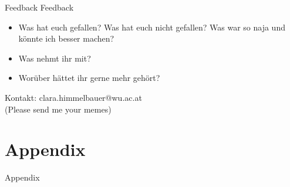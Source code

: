 \documentclass[aspectratio=169,xcolor=dvipsnames]{beamer}
\begin{document}
\begin{frame}{Feedback}
    Feedback
    \begin{itemize}
        \item Was hat euch gefallen? Was hat euch nicht gefallen? Was war so naja und könnte ich besser machen?
        \item Was nehmt ihr mit?
        \item Worüber hättet ihr gerne mehr gehört?
    \end{itemize}

    \vspace{0.5cm}
    \pause
    \begin{center}
        Kontakt: clara.himmelbauer@wu.ac.at \\
        {\small(Please send me your memes)}
    \end{center}
\end{frame}


%     
%     

\section*{Appendix}

\begin{frame}[plain,c]
    \begin{center}
    \color{DarkBlue}
        Appendix
    \end{center}
\end{frame}
\end{document}
